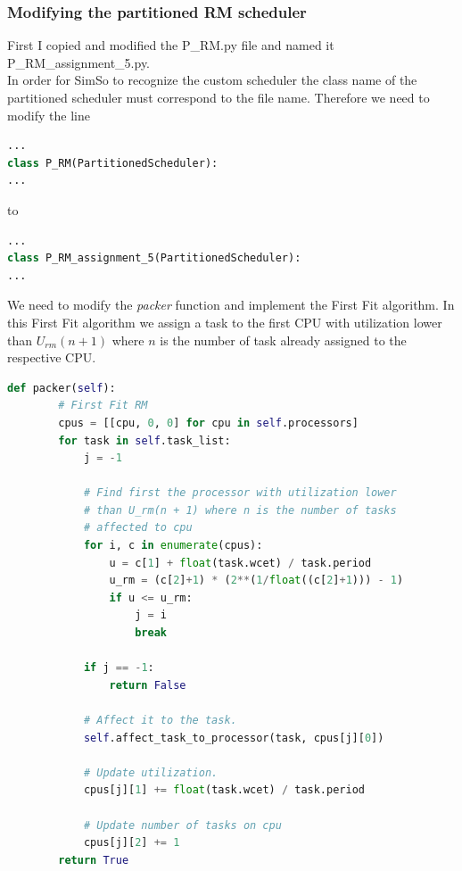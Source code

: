 \documentclass[a4paper]{article}
\begin{document}
\subsubsection{Modifying the partitioned RM scheduler}

First I copied and modified the P\_RM.py file and named it P\_RM\_assignment\_5.py.\\
In order for SimSo to recognize the custom scheduler the class name of the partitioned scheduler must correspond to the file name. Therefore we need to modify the line

\begin{lstlisting}[language=Python]
...
class P_RM(PartitionedScheduler):
...
\end{lstlisting}

to

\begin{lstlisting}[language=Python]
...
class P_RM_assignment_5(PartitionedScheduler):
...
\end{lstlisting}

We need to modify the \textit{packer} function and implement the First Fit algorithm. In this First Fit algorithm we assign a task to the first CPU with utilization lower than $U_{rm}(n+1)$ where $n$ is the number of task already assigned to the respective CPU.\\

\begin{lstlisting}[label=First Fit algorithm,caption=Affect a task to the first processor with utilization lower than $U_{rm}$,language=Python]
    def packer(self):
        # First Fit RM
        cpus = [[cpu, 0, 0] for cpu in self.processors]
        for task in self.task_list:
            j = -1

            # Find first the processor with utilization lower
            # than U_rm(n + 1) where n is the number of tasks
            # affected to cpu
            for i, c in enumerate(cpus):
                u = c[1] + float(task.wcet) / task.period
                u_rm = (c[2]+1) * (2**(1/float((c[2]+1))) - 1)
                if u <= u_rm:
                    j = i
                    break

            if j == -1:
                return False

            # Affect it to the task.
            self.affect_task_to_processor(task, cpus[j][0])

            # Update utilization.
            cpus[j][1] += float(task.wcet) / task.period

            # Update number of tasks on cpu
            cpus[j][2] += 1
        return True
\end{lstlisting}
\end{document}
